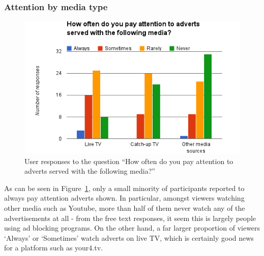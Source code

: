 \subsubsection{Attention by media type}
\begin{figure}[H]
	\vspace{-10pt}
	\includegraphics[width=\textwidth]{images/prestudy_media.png}
	\caption{User responses to the question ``How often do you pay attention to adverts served with the following media?''}
	\label{fig:prestudy_media}
	\vspace{-15pt}
\end{figure}
As can be seen in Figure~\ref{fig:prestudy_media}, only a small minority of participants reported to always pay attention adverts shown. In particular, amongst viewers watching other media such as Youtube, more than half of them never watch any of the advertisements at all - from the free text responses, it seem this is largely people using ad blocking programs. On the other hand, a far larger proportion of viewers `Always' or `Sometimes' watch adverts on live TV, which is certainly good news for a platform such as your4.tv.

